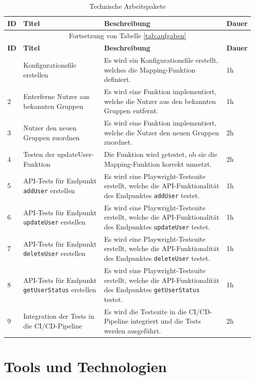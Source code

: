 \begin{longtable}{|l|p{}|p{}|l|}
  \caption{Technische Arbeitspakete} \label{tab:tech-arbeitspakete} \\
  \hline
  \textbf{ID} & \textbf{Titel} & \textbf{Beschreibung} & \textbf{Dauer} \\
  \hline
  \endfirsthead
  \multicolumn{4}{c}{Fortsetzung von Tabelle \ref{tab:aufgaben}} \\
  \hline
  \textbf{ID} & \textbf{Titel} & \textbf{Beschreibung} & \textbf{Dauer} \\
  \hline
  \endhead
  \hline
  \endfoot
  1 & Konfigurationsfile erstellen & Es wird ein Konfigurationsfile erstellt, welches die Mapping-Funktion definiert. & 1h \\
  \hline
  2 & Enterferne Nutzer aus bekannten Gruppen & Es wird eine Funktion implementiert, welche die Nutzer aus den bekannten Gruppen entfernt. & 1h \\
  \hline
  3 & Nutzer den neuen Gruppen zuordnen & Es wird eine Funktion implementiert, welche die Nutzer den neuen Gruppen zuordnet. & 2h \\
  \hline
  4 & Testen der updateUser-Funktion & Die Funktion wird getestet, ob sie die Mapping-Funktion korrekt umsetzt. & 2h \\
  \hline
  5 & API-Tests für Endpunkt \texttt{addUser} erstellen & Es wird eine Playwright-Testsuite erstellt, welche die API-Funktionalität des Endpunktes \texttt{addUser} testet. & 1h \\
  \hline
  6 & API-Tests für Endpunkt \texttt{updateUser} erstellen & Es wird eine Playwright-Testsuite erstellt, welche die API-Funktionalität des Endpunktes \texttt{updateUser} testet. & 1h \\
  \hline
  7 & API-Tests für Endpunkt \texttt{deleteUser} erstellen & Es wird eine Playwright-Testsuite erstellt, welche die API-Funktionalität des Endpunktes \texttt{deleteUser} testet. & 1h \\
  \hline
  8 & API-Tests für Endpunkt \texttt{getUserStatus} erstellen & Es wird eine Playwright-Testsuite erstellt, welche die API-Funktionalität des Endpunktes \texttt{getUserStatus} testet. & 1h \\
  \hline
  9 & Integration der Tests in die CI/CD-Pipeline & Es wird die Testsuite in die CI/CD-Pipeline integriert und die Tests werden ausgeführt. & 2h \\
  \hline
\end{longtable} 

\section{Tools und Technologien}

